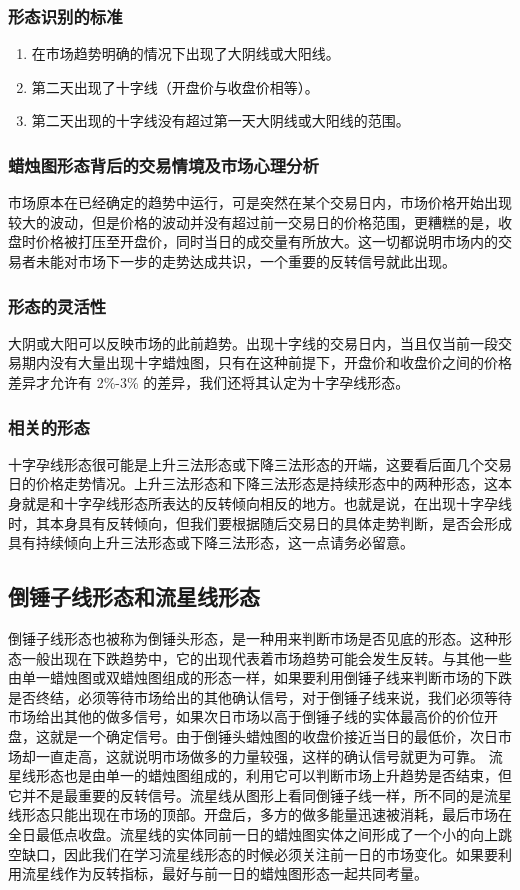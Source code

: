 \subsubsection*{形态识别的标准}
\begin{enumerate}
    \item 在市场趋势明确的情况下出现了大阴线或大阳线。
    \item 第二天出现了十字线（开盘价与收盘价相等）。
    \item 第二天出现的十字线没有超过第一天大阴线或大阳线的范围。
\end{enumerate}
\subsubsection*{蜡烛图形态背后的交易情境及市场心理分析}
市场原本在已经确定的趋势中运行，可是突然在某个交易日内，市场价格开始出现较大的波动，但是价格的波动并没有超过前一交易日的价格范围，更糟糕的是，收盘时价格被打压至开盘价，同时当日的成交量有所放大。这一切都说明市场内的交易者未能对市场下一步的走势达成共识，一个重要的反转信号就此出现。
\subsubsection*{形态的灵活性}
大阴或大阳可以反映市场的此前趋势。出现十字线的交易日内，当且仅当前一段交易期内没有大量出现十字蜡烛图，只有在这种前提下，开盘价和收盘价之间的价格差异才允许有 2\%-3\% 的差异，我们还将其认定为十字孕线形态。
\subsubsection*{相关的形态}
十字孕线形态很可能是上升三法形态或下降三法形态的开端，这要看后面几个交易日的价格走势情况。上升三法形态和下降三法形态是持续形态中的两种形态，这本身就是和十字孕线形态所表达的反转倾向相反的地方。也就是说，在出现十字孕线时，其本身具有反转倾向，但我们要根据随后交易日的具体走势判断，是否会形成具有持续倾向上升三法形态或下降三法形态，这一点请务必留意。
\subsection{倒锤子线形态和流星线形态}
倒锤子线形态也被称为倒锤头形态，是一种用来判断市场是否见底的形态。这种形态一般出现在下跌趋势中，它的出现代表着市场趋势可能会发生反转。与其他一些由单一蜡烛图或双蜡烛图组成的形态一样，如果要利用倒锤子线来判断市场的下跌是否终结，必须等待市场给出的其他确认信号，对于倒锤子线来说，我们必须等待市场给出其他的做多信号，如果次日市场以高于倒锤子线的实体最高价的价位开盘，这就是一个确定信号。由于倒锤头蜡烛图的收盘价接近当日的最低价，次日市场却一直走高，这就说明市场做多的力量较强，这样的确认信号就更为可靠。
流星线形态也是由单一的蜡烛图组成的，利用它可以判断市场上升趋势是否结束，但它并不是最重要的反转信号。流星线从图形上看同倒锤子线一样，所不同的是流星线形态只能出现在市场的顶部。开盘后，多方的做多能量迅速被消耗，最后市场在全日最低点收盘。流星线的实体同前一日的蜡烛图实体之间形成了一个小的向上跳空缺口，因此我们在学习流星线形态的时候必须关注前一日的市场变化。如果要利用流星线作为反转指标，最好与前一日的蜡烛图形态一起共同考量。
